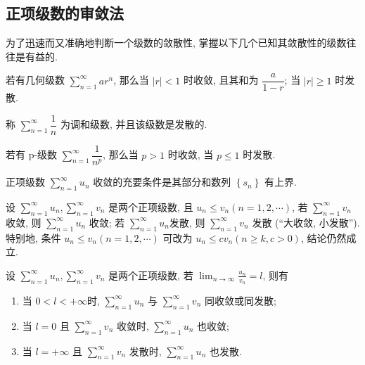 \subsection{正项级数的审敛法}

为了迅速而又准确地判断一个级数的敛散性, 掌握以下几个已知其敛散性的级数往往是有益的.

\begin{definition}[几何级数]
    若有几何级数 $\displaystyle\sum_{n=1}^{\infty}ar^n$, 那么当 $|r|<1$ 时收敛, 且其和为 $\dfrac{a}{1-r}$; 当 $|r|\geqslant 1$ 时发散.
\end{definition}

\begin{definition}[调和级数]
    称 $\displaystyle\sum_{n=1}^{\infty}\dfrac{1}{n}$ 为调和级数, 并且该级数是发散的.
\end{definition}

\begin{definition}[p-级数]
    若有 p-级数 $\displaystyle\sum_{n=1}^{\infty}\dfrac{1}{n^p}$, 那么当 $p>1$ 时收敛, 当 $p\leqslant 1$ 时发散.
\end{definition}

\begin{theorem}[正项级数收敛的充要条件]
    正项级数 $\displaystyle  \sum_{n=1}^{\infty} u_{n} $ 收敛的充要条件是其部分和数列 $ \left\{s_{n}\right\} $ 有上界.
\end{theorem}

\begin{theorem}[比较审敛法]
    设 $\displaystyle  \sum_{n=1}^{\infty} u_{n}, \sum_{n=1}^{\infty} v_{n} $ 是两个正项级数, 且 $ u_{n} \leqslant v_{n}(n=1,2, \cdots) $,
    若 $\displaystyle  \sum_{n=1}^{\infty} v_{n} $ 收敛, 则 $\displaystyle  \sum_{n=1}^{\infty} u_{n} $ 收敛; 若 $\displaystyle  \sum_{n=1}^{\infty} u_{n}  $发散, 则 $\displaystyle \sum_{n=1}^{\infty} v_{n} $ 发散 (“大收敛, 小发散”).\\
    特别地, 条件 $ u_{n} \leqslant v_{n}(n=1,2, \cdots) $ 可改为 $ u_{n} \leqslant c v_{n}(n \geqslant k, c>0)$, 结论仍然成立.
\end{theorem}

\begin{theorem}[比较审敛法的极限形式]
    设 $\displaystyle  \sum_{n=1}^{\infty} u_{n}, \sum_{n=1}^{\infty} v_{n} $ 是两个正项级数, 若 $\displaystyle  \lim _{n \rightarrow \infty} \frac{u_{n}}{v_{n}}=l $, 则有
    \begin{enumerate}[label=(\arabic{*})]
        \item 当 $ 0<l<+\infty  $时, $\displaystyle \sum_{n=1}^{\infty} u_{n} $ 与 $\displaystyle  \sum_{n=1}^{\infty} v_{n} $ 同收敛或同发散;
        \item 当 $ l=0 $ 且 $\displaystyle  \sum_{n=1}^{\infty} v_{n} $ 收敛时, $\displaystyle  \sum_{n=1}^{\infty} u_{n} $ 也收敛;
        \item 当 $ l=+\infty $ 且 $\displaystyle  \sum_{n=1}^{\infty} v_{n} $ 发散时, $\displaystyle \sum_{n=1}^{\infty} u_{n} $ 也发散.
    \end{enumerate}
\end{theorem}

